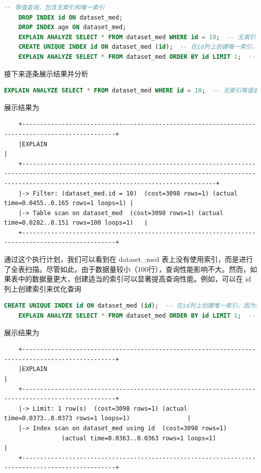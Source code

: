 \documentclass{article}
\begin{document}
	\begin{lstlisting}[language=sql, title=等值查询，并包含无索引和唯一索引, tabsize=4]
	-- 等值查询，包含无索引和唯一索引
	DROP INDEX id ON dataset_med;
	DROP INDEX age ON dataset_med;
	EXPLAIN ANALYZE SELECT * FROM dataset_med WHERE id = 10;  -- 无索引
	CREATE UNIQUE INDEX id ON dataset_med (id);  -- 在id列上创建唯一索引，因为id列中的每个值都是唯一的。
	EXPLAIN ANALYZE SELECT * FROM dataset_med ORDER BY id LIMIT 1;  -- 唯一索引
	\end{lstlisting}
	
	接下来逐条展示结果并分析
	
	\begin{lstlisting}[language=sql, title=无索引等值查询, tabsize=4]
	EXPLAIN ANALYZE SELECT * FROM dataset_med WHERE id = 10;  -- 无索引等值查询
	\end{lstlisting}
	
	展示结果为
	
	\begin{verbatim}
	+------------------------------------------------------------------------------------------------+
	|EXPLAIN                                                                                         |
	+--------------------------------------------------------------------------------------------------------------------------------------------------------------------------------------------------+
	|-> Filter: (dataset_med.id = 10)  (cost=3098 rows=1) (actual time=0.0455..0.165 rows=1 loops=1) |
	|-> Table scan on dataset_med  (cost=3098 rows=1) (actual time=0.0282..0.151 rows=100 loops=1)   |
	+------------------------------------------------------------------------------------------------+
	\end{verbatim}
	
	通过这个执行计划，我们可以看到在 dataset\_med 表上没有使用索引，而是进行了全表扫描。尽管如此，由于数据量较小（100行），查询性能影响不大。然而，如果表中的数据量更大，创建适当的索引可以显著提高查询性能。例如，可以在 id 列上创建索引来优化查询
	
	\begin{lstlisting}[language=sql, title=唯一索引等值查询, tabsize=4]
	CREATE UNIQUE INDEX id ON dataset_med (id);  -- 在id列上创建唯一索引，因为id列中的每个值都是唯一的。
	EXPLAIN ANALYZE SELECT * FROM dataset_med ORDER BY id LIMIT 1;  -- 唯一索引等值查询
	\end{lstlisting}
	
	展示结果为
	
	\begin{verbatim}
	+------------------------------------------------------------------------------------------------+
	|EXPLAIN                                                                                         |
	+------------------------------------------------------------------------------------------------+
	|-> Limit: 1 row(s)  (cost=3098 rows=1) (actual time=0.0373..0.0373 rows=1 loops=1)                |
	|-> Index scan on dataset_med using id  (cost=3098 rows=1) 
	            (actual time=0.0363..0.0363 rows=1 loops=1)                                          |
	+------------------------------------------------------------------------------------------------+
	\end{verbatim}
	
\end{document}
